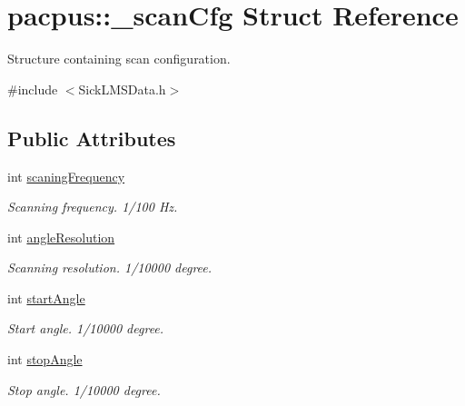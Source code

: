 \hypertarget{structpacpus_1_1__scanCfg}{\section{pacpus\-:\-:\-\_\-scan\-Cfg Struct Reference}
\label{structpacpus_1_1__scanCfg}
}


Structure containing scan configuration.  




{\ttfamily \#include $<$Sick\-L\-M\-S\-Data.\-h$>$}

\subsection*{Public Attributes}
\begin{DoxyCompactItemize}
\item 
\hypertarget{structpacpus_1_1__scanCfg_a043ffeade28db7992129c7abadcd1316}{int \hyperlink{structpacpus_1_1__scanCfg_a043ffeade28db7992129c7abadcd1316}{scaning\-Frequency}}\label{structpacpus_1_1__scanCfg_a043ffeade28db7992129c7abadcd1316}

\begin{DoxyCompactList}\small\item\em Scanning frequency. 1/100 Hz. \end{DoxyCompactList}\item 
\hypertarget{structpacpus_1_1__scanCfg_adf73bc315117f3e6fd2b09ed781c8499}{int \hyperlink{structpacpus_1_1__scanCfg_adf73bc315117f3e6fd2b09ed781c8499}{angle\-Resolution}}\label{structpacpus_1_1__scanCfg_adf73bc315117f3e6fd2b09ed781c8499}

\begin{DoxyCompactList}\small\item\em Scanning resolution. 1/10000 degree. \end{DoxyCompactList}\item 
\hypertarget{structpacpus_1_1__scanCfg_ab72c662edfc5326cf00d577e0223fc6e}{int \hyperlink{structpacpus_1_1__scanCfg_ab72c662edfc5326cf00d577e0223fc6e}{start\-Angle}}\label{structpacpus_1_1__scanCfg_ab72c662edfc5326cf00d577e0223fc6e}

\begin{DoxyCompactList}\small\item\em Start angle. 1/10000 degree. \end{DoxyCompactList}\item 
\hypertarget{structpacpus_1_1__scanCfg_a6b3839aa43b29a54becd34a29cec11fa}{int \hyperlink{structpacpus_1_1__scanCfg_a6b3839aa43b29a54becd34a29cec11fa}{stop\-Angle}}\label{structpacpus_1_1__scanCfg_a6b3839aa43b29a54becd34a29cec11fa}

\begin{DoxyCompactList}\small\item\em Stop angle. 1/10000 degree. \end{DoxyCompactList}\end{DoxyCompactItemize}


